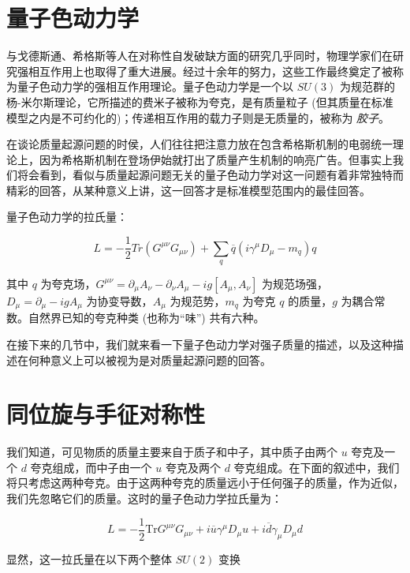 \documentclass[oneside,a4paper,openany,11pt]{ctexbook}
\begin{document}
\section{量子色动力学}

与戈德斯通、希格斯等人在对称性自发破缺方面的研究几乎同时，物理学家们在研究强相互作用上也取得了重大进展。经过十余年的努力，这些工作最终奠定了被称为量子色动力学的强相互作用理论。量子色动力学是一个以 $SU(3)$ 为规范群的杨-米尔斯理论，它所描述的费米子被称为夸克，是有质量粒子 (但其质量在标准模型之内是不可约化的)；传递相互作用的载力子则是无质量的，被称为 \emph{胶子}。

在谈论质量起源问题的时侯，人们往往把注意力放在包含希格斯机制的电弱统一理论上，因为希格斯机制在登场伊始就打出了质量产生机制的响亮广告。但事实上我们将会看到，看似与质量起源问题无关的量子色动力学对这一问题有着非常独特而精彩的回答，从某种意义上讲，这一回答才是标准模型范围内的最佳回答。

量子色动力学的拉氏量：

\begin{equation}
    L = -\frac{1}{2} Tr(G^{\mu\nu} G_{\mu\nu}) + \sum_q \overline{q}(i\gamma^\mu D_\mu - m_q)q
\end{equation}

\noindent 其中 $q$ 为夸克场，$G^{\mu\nu}=\partial_\mu A_\nu - \partial_\nu A_\mu - i g [A_\mu, A_\nu]$ 为规范场强，$D_\mu=\partial_\mu-i g A_\mu$ 为协变导数，$A_\mu$ 为规范势，$m_q$ 为夸克 $q$ 的质量，$g$ 为耦合常数。自然界已知的夸克种类 (也称为“味”) 共有六种。

在接下来的几节中，我们就来看一下量子色动力学对强子质量的描述，以及这种描述在何种意义上可以被视为是对质量起源问题的回答。

\section{同位旋与手征对称性}

我们知道，可见物质的质量主要来自于质子和中子，其中质子由两个 $u$ 夸克及一个 $d$ 夸克组成，而中子由一个 $u$ 夸克及两个 $d$ 夸克组成。在下面的叙述中，我们将只考虑这两种夸克。由于这两种夸克的质量远小于任何强子的质量，作为近似，我们先忽略它们的质量。这时的量子色动力学拉氏量为：

\begin{equation}
    L = -\frac{1}{2} \mathrm{Tr} G^{\mu\nu} G_{\mu\nu} + i \overline{u} \gamma^\mu D_\mu u + i \overline{d} \gamma_\mu D_\mu d
\end{equation}

\noindent 显然，这一拉氏量在以下两个整体 $SU(2)$ 变换
\end{document}
